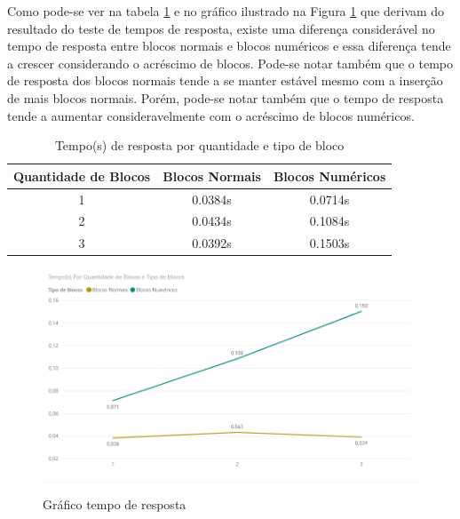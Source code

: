 Como pode-se ver na tabela \ref{table:tempo_resposta} e no gráfico ilustrado na Figura \ref{figura:ttr_grafico} que derivam do resultado do teste de tempos de resposta, existe uma diferença considerável no tempo de resposta entre blocos normais e blocos numéricos e essa diferença tende a crescer considerando o acréscimo de blocos. Pode-se notar também que o tempo de resposta dos blocos normais tende a se manter estável mesmo com a inserção de mais blocos normais. Porém, pode-se notar também que o tempo de resposta tende a aumentar consideravelmente com o acréscimo de blocos numéricos. 

    \begin{table}[H]
        \centering
        \caption{Tempo(s) de resposta por quantidade e tipo de bloco }
        \label{table:tempo_resposta}
        \begin{tabular}{ |c|c|c| } 
         \hline
        Quantidade de Blocos & Blocos Normais & Blocos Numéricos \\
         \hline
        1 & 0.0384s & 0.0714s \\
         \hline
        2 & 0.0434s & 0.1084s\\
         \hline
        3 & 0.0392s & 0.1503s\\    [0.5ex]    
         \hline
        
        \end{tabular}
    \end{table}

\begin{figure}[H]
    \caption{Gráfico tempo de resposta}
    \centering
    \includegraphics[width=14cm]{Imagens/Cap5/ttr_grafico.PNG}
    \label{figura:ttr_grafico}
\end{figure}

